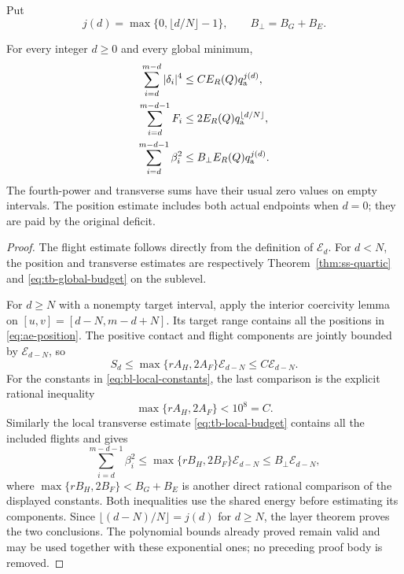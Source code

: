 Put
\begin{equation}\label{eq:ae-j-and-B}
 j(d)=\max\{0,\lfloor d/N\rfloor-1\},
 \qquad B_\perp=B_G+B_E.
\end{equation}

\begin{corollary}
\label{cor:ae-geometric}
For every integer $d\ge0$ and every global minimum,
\begin{align}
 \sum_{i=d}^{m-d}|\delta_i|^4
     &\le C E_R(Q)q_{\rm a}^{j(d)},
                       \label{eq:ae-position}\\
 \sum_{i=d}^{m-d-1}F_i
     &\le 2E_R(Q)q_{\rm a}^{\lfloor d/N\rfloor},
                       \label{eq:ae-flight}\\
 \sum_{i=d}^{m-d-1}\beta_i^2
     &\le B_\perp E_R(Q)q_{\rm a}^{j(d)}.
                       \label{eq:ae-transverse}
\end{align}
The fourth-power and transverse sums have their usual zero values on
empty intervals.  The position estimate includes both actual endpoints
when $d=0$; they are paid by the original deficit.
\end{corollary}
\begin{proof}
The flight estimate follows directly from the definition of
$\mathcal E_d$.  For $d<N$, the position and transverse estimates
are respectively Theorem~\ref{thm:ss-quartic} and
\eqref{eq:tb-global-budget} on the sublevel.

For $d\ge N$ with a nonempty target interval, apply the interior
coercivity lemma on $[u,v]=[d-N,m-d+N]$.  Its target range contains
all the positions in \eqref{eq:ae-position}.  The positive contact
and flight components are jointly bounded by $\mathcal E_{d-N}$,
so
\[
 S_d\le\max\{rA_H,2A_F\}\mathcal E_{d-N}
       \le C\mathcal E_{d-N}.
\]
For the constants in \eqref{eq:bl-local-constants}, the last comparison
is the explicit rational inequality
\[
 \max\{rA_H,2A_F\}<10^8=C.
\]
Similarly the local transverse
estimate \eqref{eq:tb-local-budget} contains all the included flights
and gives
\[
 \sum_{i=d}^{m-d-1}\beta_i^2
 \le\max\{rB_H,2B_F\}\mathcal E_{d-N}
 \le B_\perp\mathcal E_{d-N},
\]
where $\max\{rB_H,2B_F\}<B_G+B_E$ is another direct rational
comparison of the displayed constants.  Both inequalities use the
shared energy before estimating its components.  Since
$\lfloor(d-N)/N\rfloor=j(d)$ for $d\ge N$, the layer theorem
proves the two conclusions.  The polynomial bounds already proved
remain valid and may be used together with these exponential ones;
no preceding proof body is removed.
\end{proof}

